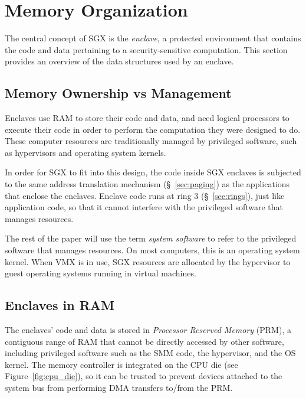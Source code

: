 \section{Memory Organization}
\label{sec:memory}

The central concept of SGX is the \textit{enclave}, a protected environment
that contains the code and data pertaining to a security-sensitive computation.
This section provides an overview of the data structures used by an enclave.


\subsection{Memory Ownership vs Management}


Enclaves use RAM to store their code and data, and need logical processors to
execute their code in order to perform the computation they were designed to
do. These computer resources are traditionally managed by privileged software,
such as hypervisors and operating system kernels.

In order for SGX to fit into this design, the code inside SGX enclaves is
subjected to the same address translation mechanism (\S~\ref{sec:paging}) as
the applications that enclose the enclaves. Enclave code runs at ring 3
(\S~\ref{sec:rings}), just like application code, so that it cannot
interfere with the privileged software that manages resources.


The rest of the paper will use the term \textit{system software} to refer to
the privileged software that manages resources. On most computers, this is an
operating system kernel. When VMX is in use, SGX resources are allocated by
the hypervisor to guest operating systems running in virtual machines.


\subsection{Enclaves in RAM}
\label{sec:prm}


The enclaves' code and data is stored in \textit{Processor Reserved Memory}
(PRM), a contiguous range of RAM that cannot be directly accessed by other
software, including privileged software such as the SMM code, the hypervisor,
and the OS kernel. The memory controller is integrated on the CPU die (see
Figure~\ref{fig:cpu_die}), so it can be trusted to prevent devices attached to
the system bus from performing DMA transfers to/from the PRM.

